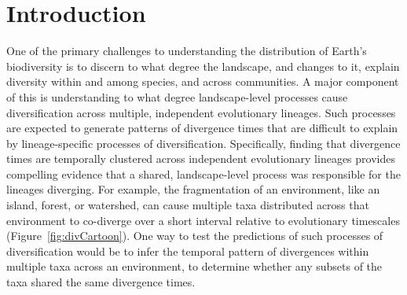 \section{Introduction}

One of the primary challenges to understanding the distribution of Earth's
biodiversity is to discern to what degree the landscape, and changes to it,
explain diversity within and among species, and across communities.
A major component of this is understanding to what degree landscape-level
processes cause diversification across multiple, independent evolutionary
lineages.
Such processes are expected to generate patterns of divergence times that are
difficult to explain by lineage-specific processes of diversification.
Specifically, finding that divergence times are temporally clustered across
independent evolutionary lineages provides compelling evidence that a shared,
landscape-level process was responsible for the lineages diverging.
For example, the fragmentation of an environment, like an island, forest, or
watershed, can cause multiple taxa distributed across that environment to
co-diverge over a short interval relative to evolutionary timescales
(Figure~\ref{fig:divCartoon}).
One way to test the predictions of such processes of diversification would be
to infer the temporal pattern of divergences within multiple taxa across an
environment, to determine whether any subsets of the taxa shared the same
divergence times.

